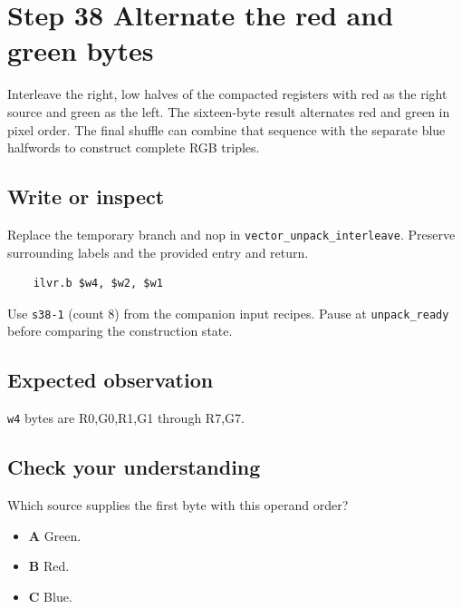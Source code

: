 \section{Step 38 Alternate the red and green bytes}\label{rgb-s38}

Interleave the right, low halves of the compacted registers with red as the right source and green as the left. The sixteen-byte result alternates red and green in pixel order. The final shuffle can combine that sequence with the separate blue halfwords to construct complete RGB triples.

\subsection{Write or inspect}
Replace the temporary branch and nop in \texttt{vector\_unpack\_interleave}. Preserve surrounding labels and the provided entry and return.

\begin{verbatim}
    ilvr.b $w4, $w2, $w1
\end{verbatim}
Use \texttt{s38-1} (count 8) from the companion input recipes. Pause at \texttt{unpack\_ready} before comparing the construction state.

\subsection{Expected observation}
\texttt{w4} bytes are R0,G0,R1,G1 through R7,G7.

\subsection{Check your understanding}
Which source supplies the first byte with this operand order?

\begin{itemize}
  \item \textbf{A} Green.
  \item \textbf{B} Red.
  \item \textbf{C} Blue.
\end{itemize}

